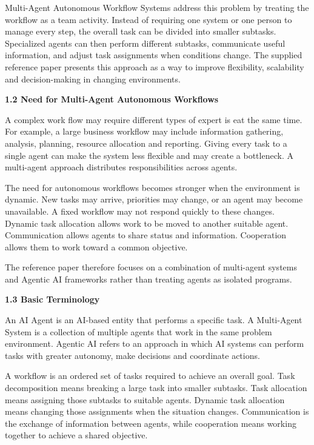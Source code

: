\documentclass[12pt,letterpaper]{article}
\newcommand{\sectiontitle}[1]{%
  \vspace{6pt}%
  {\noindent\fontsize{13.2pt}{16pt}\selectfont\bfseries #1\par}%
  \vspace{2pt}%
}
\begin{document}
Multi-Agent Autonomous Workflow Systems address this problem by treating the workflow as a team activity. Instead of requiring one system or one person to manage every step, the overall task can be divided into smaller subtasks. Specialized agents can then perform different subtasks, communicate useful information, and adjust task assignments when conditions change. The supplied reference paper presents this approach as a way to improve flexibility, scalability and decision-making in changing environments.

\sectiontitle{1.2 Need for Multi-Agent Autonomous Workflows}
A complex work flow may require different types of expert is eat the same time. For example, a large business workflow may include information gathering, analysis, planning, resource allocation and reporting. Giving every task to a single agent can make the system less flexible and may create a bottleneck. A multi-agent approach distributes responsibilities across agents.
\newpage

The need for autonomous workflows becomes stronger when the environment is dynamic. New tasks may arrive, priorities may change, or an agent may become unavailable. A fixed workflow may not respond quickly to these changes. Dynamic task allocation allows work to be moved to another suitable agent. Communication allows agents to share status and information. Cooperation allows them to work toward a common objective.

The reference paper therefore focuses on a combination of multi-agent systems and Agentic AI frameworks rather than treating agents as isolated programs.

\sectiontitle{1.3 Basic Terminology}
An AI Agent is an AI-based entity that performs a specific task. A Multi-Agent System is a collection of multiple agents that work in the same problem environment. Agentic AI refers to an approach in which AI systems can perform tasks with greater autonomy, make decisions and coordinate actions.

A workflow is an ordered set of tasks required to achieve an overall goal. Task decomposition means breaking a large task into smaller subtasks. Task allocation means assigning those subtasks to suitable agents. Dynamic task allocation means changing those assignments when the situation changes. Communication is the exchange of information between agents, while cooperation means working together to achieve a shared objective.
\end{document}
